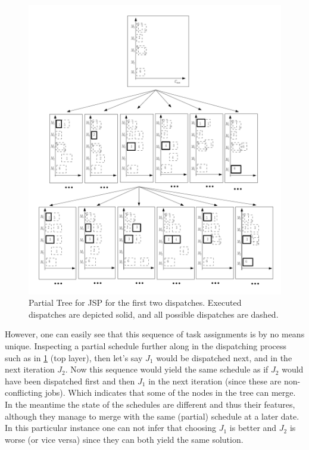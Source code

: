 \documentclass[smallextended]{llncs}
\begin{document}
\begin{figure}[t!]
\includegraphics[width=\columnwidth]{figures/gametree}
\caption[Partial Game Tree for JSP]{Partial Tree for JSP for the first two dispatches. 
Executed dispatches are depicted solid, and all possible dispatches are dashed.}
\label{fig:jssp:gametree}
\end{figure}

However, one can easily see that this sequence of task assignments is by no means unique. Inspecting a partial 
schedule further along in the dispatching process such as in  \cref{fig:jssp:gametree} (top layer), then let's say 
$J_1$ 
would be dispatched next, and in the next iteration $J_2$. Now this sequence would yield the same schedule as if $J_2$ 
would have been dispatched first and then $J_1$ in the next iteration (since these are non-conflicting jobs). Which 
indicates that some of the nodes in the tree can merge. In the meantime the state of the schedules are different and 
thus their features, although they manage to merge with the same (partial) schedule at a later date.  %
In this particular instance one can not infer that choosing $J_1$ is better and $J_2$ is worse (or vice versa) since they can both yield the same solution.
\end{document}
